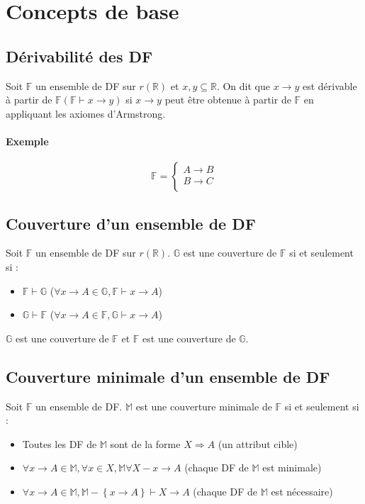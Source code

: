 \documentclass[10pt]{article}
\begin{document}
    \section{Concepts de base}
        \subsection{Dérivabilité des DF}
            Soit $\mathbb{F}$ un ensemble de DF sur $r(\mathbb{R})$ et $x,y\subseteq\mathbb{R}$. On dit que $x\rightarrow y$ est dérivable à partir de $\mathbb{F}(\mathbb{F}\vdash x\rightarrow y)$ si $x\rightarrow y$ peut être obtenue à partir de $\mathbb{F}$ en appliquant les axiomes d'Armstrong.

            \paragraph{Exemple}
            $$\mathbb{F}=\left\{\begin{array}{l}
                A\rightarrow B\\
                B\rightarrow C\\
            \end{array}\right.$$
			
		\subsection{Couverture d'un ensemble de DF}
			Soit $\mathbb{F}$ un ensemble de DF sur $r(\mathbb{R})$. $\mathbb{G}$ est une couverture de $\mathbb{F}$ si et seulement si :
			\begin{itemize}
				\item $\mathbb{F}\vdash\mathbb{G}$ ($\forall x \rightarrow A\in\mathbb{G},\mathbb{F}\vdash x\rightarrow A$)
				\item $\mathbb{G}\vdash\mathbb{F}$ ($\forall x \rightarrow A\in\mathbb{F},\mathbb{G}\vdash x\rightarrow A$)
			\end{itemize}

			$\mathbb{G}$ est une couverture de $\mathbb{F}$ et $\mathbb{F}$ est une couverture de $\mathbb{G}$.
			
		\subsection{Couverture minimale d'un ensemble de DF}
			Soit $\mathbb{F}$ un ensemble de DF. $\mathbb{M}$ est une couverture minimale de $\mathbb{F}$ si et seulement si :
			\begin{itemize}
				\item Toutes les DF de $\mathbb{M}$ sont de la forme $X\Rightarrow A$ (un attribut cible)
				\item $\forall x\rightarrow A\in\mathbb{M},\forall x\in X,\mathbb{M}\forall X-x\rightarrow A$ (chaque DF de $\mathbb{M}$ est minimale)
				\item $\forall x\rightarrow A\in\mathbb{M},\mathbb{M}-\left\{x\rightarrow A\right\}\vdash X\rightarrow A$ (chaque DF de $\mathbb{M}$ est nécessaire)
			\end{itemize}
\end{document}
